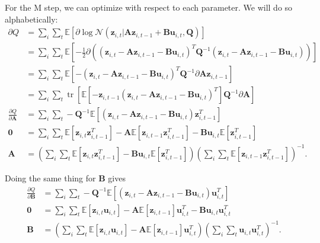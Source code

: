 \documentclass[a4paper,11pt]{article}
\DeclareMathOperator*{\tr}{tr}
\begin{document}
For the M step, we can optimize with respect to each parameter. We will do so alphabetically:
\begin{align*}
	\partial Q &= \sum\limits_i\sum\limits_t \mathbb{E}[
		\partial \log \mathcal{N}(
			\mathbf{z}_{i,t}
			| \mathbf{A}\mathbf{z}_{i,t-1} + \mathbf{B}\mathbf{u}_{i,t}, \mathbf{Q}
		)
	] \\
	&= \sum\limits_i\sum\limits_t \mathbb{E}\left[
		-\frac12 \partial\left(
			\left(
				\mathbf{z}_{i,t} - \mathbf{A}\mathbf{z}_{i,t-1} - \mathbf{B}\mathbf{u}_{i,t}
			\right)^T \mathbf{Q}^{-1} \left(
				\mathbf{z}_{i,t} - \mathbf{A}\mathbf{z}_{i,t-1} - \mathbf{B}\mathbf{u}_{i,t}
			\right)
		\right)
	\right] \\
	&= \sum\limits_i\sum\limits_t \mathbb{E}\left[
		- \left(
			\mathbf{z}_{i,t} - \mathbf{A}\mathbf{z}_{i,t-1} - \mathbf{B}\mathbf{u}_{i,t}
		\right)^T \mathbf{Q}^{-1} \partial\mathbf{A}\mathbf{z}_{i,t-1}
	\right] \\
	&= \sum\limits_i\sum\limits_t \tr\left[
		\mathbb{E}\left[
			- \mathbf{z}_{i,t-1} \left(
				\mathbf{z}_{i,t} - \mathbf{A}\mathbf{z}_{i,t-1} - \mathbf{B}\mathbf{u}_{i,t}
			\right)^T
		\right] \mathbf{Q}^{-1} \partial\mathbf{A} 
	\right] \\
	\frac{ \partial Q }{ \partial\mathbf{A} }
	&= \sum\limits_i\sum\limits_t
	- \mathbf{Q}^{-1} \mathbb{E}\left[
		\left(
			\mathbf{z}_{i,t} - \mathbf{A}\mathbf{z}_{i,t-1} - \mathbf{B}\mathbf{u}_{i,t}
		\right) \mathbf{z}_{i,t-1}^T
	\right] \\
	\mathbf{0} &= \sum\limits_i\sum\limits_t
	\mathbb{E}\left[ \mathbf{z}_{i,t} \mathbf{z}_{i,t-1}^T \right]
	- \mathbf{A} \mathbb{E}\left[ \mathbf{z}_{i,t-1} \mathbf{z}_{i,t-1}^T \right]
	- \mathbf{B}\mathbf{u}_{i,t} \mathbb{E}[ \mathbf{z}_{i,t-1}^T ] \\
	\mathbf{A} &= \left(
		\sum\limits_i\sum\limits_t
		\mathbb{E}\left[ \mathbf{z}_{i,t} \mathbf{z}_{i,t-1}^T \right]
		- \mathbf{B}\mathbf{u}_{i,t} \mathbb{E}\left[ \mathbf{z}_{i,t-1}^T \right]
	\right)\left(
		\sum\limits_i\sum\limits_t
		\mathbb{E}\left[ \mathbf{z}_{i,t-1} \mathbf{z}_{i,t-1}^T \right]
	\right)^{-1}.
\end{align*} 

Doing the same thing for $\mathbf{B}$ gives
\begin{align*}
	\frac{ \partial Q }{ \partial\mathbf{B} }
	&= \sum\limits_i\sum\limits_t
	- \mathbf{Q}^{-1} \mathbb{E}\left[
		\left(
			\mathbf{z}_{i,t} - \mathbf{A}\mathbf{z}_{i,t-1} - \mathbf{B}\mathbf{u}_{i,t}
		\right) \mathbf{u}_{i,t}^T
	\right] \\
	\mathbf{0} &= \sum\limits_i\sum\limits_t 
	\mathbb{E}\left[ \mathbf{z}_{i,t} \mathbf{u}_{i,t} \right]
	- \mathbf{A} \mathbb{E}[ \mathbf{z}_{i,t-1} ] \mathbf{u}_{i,t}^T
	- \mathbf{B}\mathbf{u}_{i,t}\mathbf{u}_{i,t}^T \\
	\mathbf{B} &= \left(
		\sum\limits_i\sum\limits_t 
		\mathbb{E}\left[ \mathbf{z}_{i,t} \mathbf{u}_{i,t} \right]
		- \mathbf{A}\mathbb{E}[ \mathbf{z}_{i,t-1} ] \mathbf{u}_{i,t}^T
	\right)\left(
		\sum\limits_i\sum\limits_t 
		\mathbf{u}_{i,t}\mathbf{u}_{i,t}^T
	\right) ^{-1}.
\end{align*}
\end{document}
